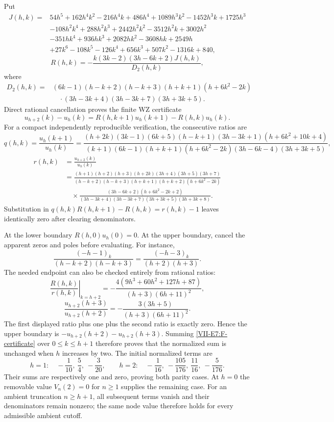 \documentclass[11pt,letterpaper]{article}
\numberwithin{equation}{section}
\begin{document}
Put
\begin{align*}
 J(h,k)={}&54h^5+162h^4k^2-216h^4k+486h^4
 +1089h^3k^2-1452h^3k+1725h^3\\
 &-108h^2k^4+288h^2k^3+2442h^2k^2-3512h^2k+3002h^2\\
 &-351hk^4+936hk^3+2082hk^2-3608hk+2549h\\
 &+27k^6-108k^5-126k^4+656k^3+507k^2-1316k+840,
\end{align*}
\[
 R(h,k)=-\frac{k(3k-2)(3h-6k+2)J(h,k)}{D_2(h,k)},
\]
where
\begin{align*}
 D_2(h,k)={}&(6k-1)(h-k+2)(h-k+3)(h+k+1)(h+6k^2-2k)\\
 &\quad\cdot(3h-3k+4)(3h-3k+7)(3h+3k+5).
\end{align*}
Direct rational cancellation proves the finite WZ certificate
\begin{equation}\label{VII-E7:F-certificate}
 u_{h+2}(k)-u_h(k)
 =R(h,k+1)u_h(k+1)-R(h,k)u_h(k).
\end{equation}
For a compact independently reproducible verification, the consecutive
ratios are
\[
 q(h,k)=\frac{u_h(k+1)}{u_h(k)}
 =\frac{(h+2k)(3k-1)(6k+5)(h-k+1)(3h-3k+1)
 (h+6k^2+10k+4)}
 {(k+1)(6k-1)(h+k+1)(h+6k^2-2k)
 (3h-6k-4)(3h+3k+5)},
\]
\begin{align*}
 r(h,k)&=\frac{u_{h+2}(k)}{u_h(k)}\\
 &=\frac{(h+1)(h+2)(h+3)(h+2k)(3h+4)(3h+5)(3h+7)}
 {(h-k+2)(h-k+3)(h+k+1)(h+k+2)(h+6k^2-2k)}\\
 &\quad\times\frac{(3h-6k+2)(h+6k^2-2k+2)}
 {(3h-3k+4)(3h-3k+7)(3h+3k+5)(3h+3k+8)}.
\end{align*}
Substitution in $q(h,k)R(h,k+1)-R(h,k)=r(h,k)-1$ leaves
identically zero after clearing denominators.

At the lower boundary $R(h,0)u_h(0)=0$. At the upper boundary,
cancel the apparent zeros and poles before evaluating. For instance,
\[
 \frac{(-h-1)_k}{(h-k+2)(h-k+3)}
 =\frac{(-h-3)_k}{(h+2)(h+3)}.
\]
The needed endpoint can also be checked entirely from rational ratios:
\[
 \left.\frac{R(h,k)}{r(h,k)}\right|_{k=h+2}
 =-\frac{4(9h^3+60h^2+127h+87)}{(h+3)(6h+11)^2},
\]
\[
 \frac{u_{h+2}(h+3)}{u_{h+2}(h+2)}
 =-\frac{3(3h+5)}{(h+3)(6h+11)^2}.
\]
The first displayed ratio plus one plus the second ratio is exactly
zero. Hence the upper boundary is
$-u_{h+2}(h+2)-u_{h+2}(h+3)$. Summing
\eqref{VII-E7:F-certificate} over $0\le k\le h+1$ therefore proves that
the normalized sum is unchanged when $h$ increases by two.
The initial normalized terms are
\[
 h=1:\quad -\frac1{10},\ \frac54,\ -\frac3{20},
 \qquad
 h=2:\quad-\frac1{16},\ -\frac{105}{176},\ \frac{11}{16},\ -\frac5{176}.
\]
Their sums are respectively one and zero, proving both parity cases.
At $h=0$ the removable value $V_n(2)=0$ for $n\ge1$ supplies the
remaining case. For an ambient truncation $n\ge h+1$, all subsequent
terms vanish and their denominators remain nonzero; the same node
value therefore holds for every admissible ambient cutoff.
\end{document}
